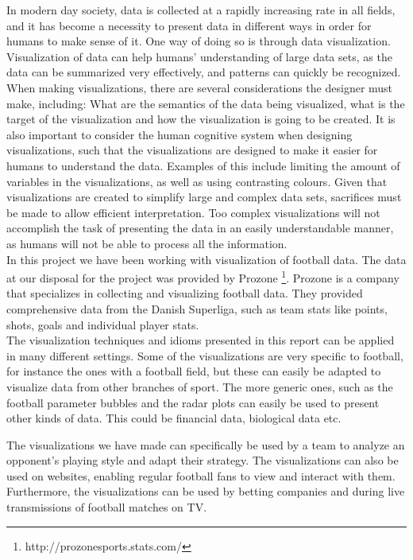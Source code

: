 \documentclass[Report.tex]{subfiles}
\begin{document}
In modern day society, data is collected at a rapidly increasing rate in all fields, and it has become a necessity to present data in different ways in order for humans to make sense of it. One way of doing so is through data visualization. Visualization of data can help humans' understanding of large data sets, as the data can be summarized very effectively, and patterns can quickly be recognized. When making visualizations, there are several considerations the designer must make, including: What are the semantics of the data being visualized, what is the target of the visualization and how the visualization is going to be created. It is also important to consider the human cognitive system when designing visualizations, such that the visualizations are designed to make it easier for humans to understand the data. Examples of this include limiting the amount of variables in the visualizations, as well as using contrasting colours. Given that visualizations are created to simplify large and complex data sets, sacrifices must be made to allow efficient interpretation. Too complex visualizations will not accomplish the task of presenting the data in an easily understandable manner, as humans will not be able to process all the information.
\\

In this project we have been working with visualization of football data. The data at our disposal for the project was provided by Prozone \footnote{http://prozonesports.stats.com/}. Prozone is a company that specializes in collecting and visualizing football data. They provided comprehensive data from the Danish Superliga, such as team stats like points, shots, goals and individual player stats.
\\

The visualization techniques and idioms presented in this report can be applied in many different settings. Some of the visualizations are very specific to football, for instance the ones with a football field, but these can easily be adapted to visualize data from other branches of sport. The more generic ones, such as the football parameter bubbles and the radar plots can easily be used to present other kinds of data. This could be financial data, biological data etc. 

The visualizations we have made can specifically be used by a team to analyze an opponent's playing style and adapt their strategy. The visualizations can also be used on websites, enabling regular football fans to view and interact with them. Furthermore, the visualizations can be used by betting companies and during live transmissions of football matches on TV.
\\
\end{document}
